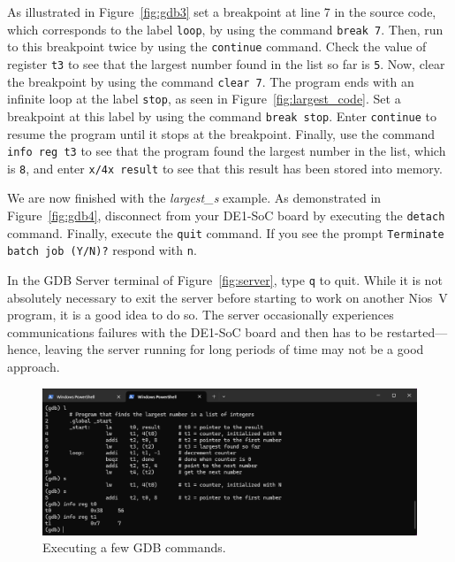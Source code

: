 \documentclass[11pt, twoside, pdftex]{article}
\begin{document}
{As illustrated in Figure~\ref{fig:gdb3} set a breakpoint at line 7 in the source code,
which corresponds to the label \texttt{loop}, by using the command \texttt{break 7}.
Then, run to this breakpoint twice by using the \texttt{continue}
command. Check the value of register \texttt{t3} to see that the largest number found in
the list so far is \texttt{5}. 
Now, clear the breakpoint by using the command \texttt{clear 7}. The program ends with an 
infinite loop at the label \texttt{stop}, as seen in Figure~\ref{fig:largest_code}. Set a
breakpoint at this label by using the command \texttt{break stop}. Enter \texttt{continue} to 
resume the program until it stops at the breakpoint. 
Finally, use the command \texttt{info reg t3} to see that the program 
found the largest number in the list, which is \texttt{8}, and enter \texttt{x/4x result} 
to see that this result has been stored into memory.

We are now finished with the {\it largest\_s} example. As demonstrated in Figure~\ref{fig:gdb4},
disconnect from your DE1-SoC board by executing the \texttt{detach} command. Finally, execute
the \texttt{quit} command. If you see the prompt \texttt{Terminate batch job (Y/N)?}
respond with \texttt{n}.

In the GDB Server terminal of Figure~\ref{fig:server}, type \texttt{q} to quit. While
it is not absolutely necessary to exit the server before starting to work on another
Nios~V program, it is a good idea to do so. The server occasionally experiences
communications failures with the DE1-SoC board and then has to be restarted---hence, leaving 
the server running for long periods of time may not be a good approach.
        
\begin{figure}[h]
    \begin{center}
        \includegraphics[scale=.6]{figures/gdb2.png}
        \caption{Executing a few GDB commands.}
        \label{fig:gdb2}
    \end{center}
\end{figure}

}
\end{document}
